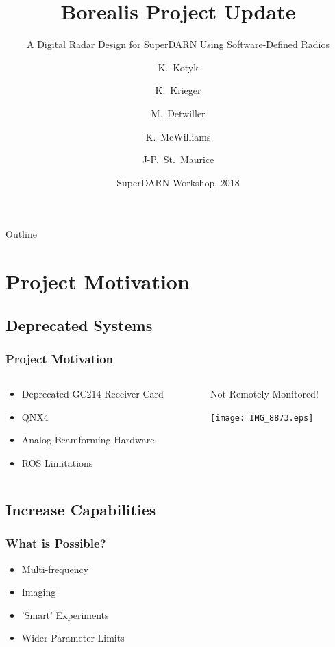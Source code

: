 \documentclass{beamer}
\title{Borealis Project Update}
\subtitle{A Digital Radar Design for SuperDARN Using Software-Defined Radios}
\author{K.~Kotyk \and K.~Krieger \and M.~Detwiller \and K.~McWilliams \and J-P.~St.~Maurice}
\institute[University of Saskatchewan] %
\date{SuperDARN Workshop, 2018}
\begin{document}
\begin{frame}
  \titlepage
\end{frame}

\begin{frame}{Outline}
  \tableofcontents
\end{frame}

\section{Project Motivation}

\subsection{Deprecated Systems}

\begin{frame}
\frametitle{Project Motivation}
  \begin{columns}[T]
    \begin{column}{.5\textwidth}
     \begin{itemize}
      \item<bullet@1-> Deprecated GC214 Receiver Card
      \item<bullet@1-> QNX4
      \item<bullet@1-> Analog Beamforming Hardware
      \item<bullet@1-> ROS Limitations
     \end{itemize}
    \end{column}
    \begin{column}{.5\textwidth}
    Not Remotely Monitored!
    \begin{block}{}
    \texttt{[image: IMG\_8873.eps]}
    \end{block}
    \end{column}
  \end{columns}
\end{frame}

\subsection{Increase Capabilities}

\begin{frame}
\frametitle{What is Possible?}
     \begin{itemize}
      \item<bullet@1-> Multi-frequency
      \item<bullet@1-> Imaging
      \item<bullet@1-> 'Smart' Experiments
      \item<bullet@1-> Wider Parameter Limits
     \end{itemize}
\end{frame}
\end{document}

